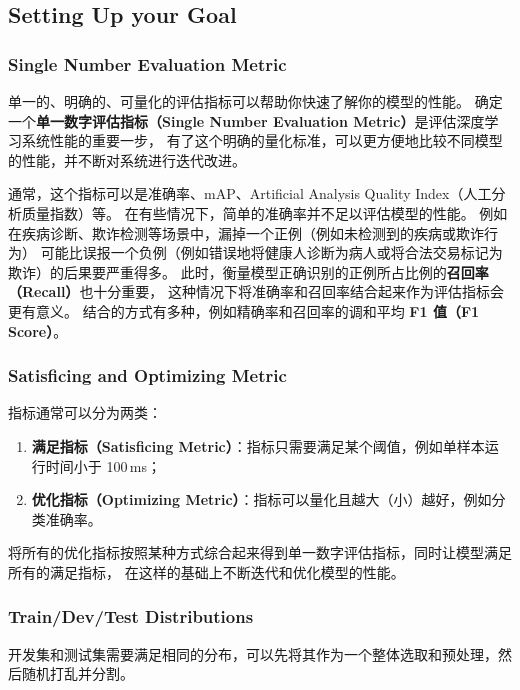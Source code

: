 \subsection{Setting Up your Goal}

\subsubsection{Single Number Evaluation Metric}

单一的、明确的、可量化的评估指标可以帮助你快速了解你的模型的性能。
确定一个\textbf{单一数字评估指标（Single Number Evaluation Metric）}是评估深度学习系统性能的重要一步，
有了这个明确的量化标准，可以更方便地比较不同模型的性能，并不断对系统进行迭代改进。

通常，这个指标可以是准确率、mAP、Artificial Analysis Quality Index（人工分析质量指数）等。
在有些情况下，简单的准确率并不足以评估模型的性能。
例如在疾病诊断、欺诈检测等场景中，漏掉一个正例（例如未检测到的疾病或欺诈行为）
可能比误报一个负例（例如错误地将健康人诊断为病人或将合法交易标记为欺诈）的后果要严重得多。
此时，衡量模型正确识别的正例所占比例的\textbf{召回率（Recall）}也十分重要，
这种情况下将准确率和召回率结合起来作为评估指标会更有意义。
结合的方式有多种，例如精确率和召回率的调和平均 \textbf{F1 值（F1 Score）}。

\subsubsection{Satisficing and Optimizing Metric}

指标通常可以分为两类：

\begin{enumerate}
    \item \textbf{满足指标（Satisficing Metric）}：指标只需要满足某个阈值，例如单样本运行时间小于 100\,ms；
    \item \textbf{优化指标（Optimizing Metric）}：指标可以量化且越大（小）越好，例如分类准确率。
\end{enumerate}

将所有的优化指标按照某种方式综合起来得到单一数字评估指标，同时让模型满足所有的满足指标，
在这样的基础上不断迭代和优化模型的性能。

\subsubsection{Train/Dev/Test Distributions}

开发集和测试集需要满足相同的分布，可以先将其作为一个整体选取和预处理，然后随机打乱并分割。

